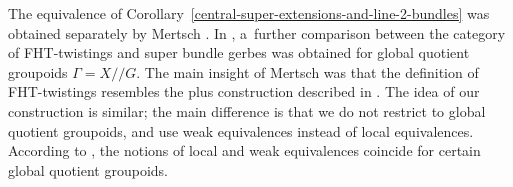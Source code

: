 \documentclass[10pt,a4paper]{amsart}
\numberwithin{equation}{section}
\def\act#1#2{#1/\!\!/#2}
\begin{document}
\begin{Remark}
The equivalence of Corollary~\ref{central-super-extensions-and-line-2-bundles} was obtained separately by Mertsch
\cite[Proposition~B.3.7]{Mertsch2020}.
In \cite[Theorem~B.3.13]{Mertsch2020}, a~further comparison between the category of FHT-twistings and super bundle gerbes
was obtained for global quotient groupoids $\Gamma=\act XG$. The main insight of Mertsch was that the definition of FHT-twistings
resembles the plus construction described in {\cite[Proposition 9.1]{nikolaus2}}. The idea of our construction is similar; the main difference is that
we do not restrict to global quotient groupoids, and use weak equivalences instead of local equivalences. According to \cite[Lemma B.3.10]{Mertsch2020}, the notions of local and weak equivalences coincide for certain global quotient groupoids. \end{Remark}
\end{document}
